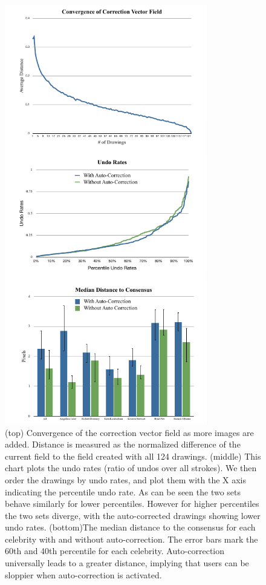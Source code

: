 \begin{figure}
  \centering%
\includegraphics[width=3.5in]{./figures/userstudy/threeGraphs.pdf}
  \caption{(top) Convergence of the correction vector field as more images are added. Distance is measured as the normalized difference of the current field to the field created with all 124 drawings.  (middle) This chart plots the undo rates (ratio of undos over all strokes). We then order the drawings by undo rates, and plot them with the X axis indicating the percentile undo rate. As can be seen the two sets behave similarly for lower percentiles. However for higher percentiles the two sets diverge, with the auto-corrected drawings showing lower undo rates. (bottom)The median distance to the consensus for each celebrity with and without auto-correction. The error bars mark the 60th and 40th percentile for each celebrity. Auto-correction universally leads to a greater distance, implying that users can be sloppier when auto-correction is activated.}
  \label{fig:daf-three}
\end{figure}

